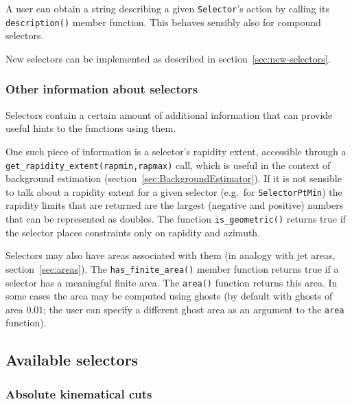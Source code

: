 \documentclass[12pt,a4]{article}
\newcommand{\ttt}[1]{{\small\texttt{#1}}}
\begin{document}
A user can obtain a string describing a given \ttt{Selector}'s action by
calling its \ttt{description()} member function. 
%
This behaves sensibly also for compound selectors.

New selectors can be implemented as described in
section~\ref{sec:new-selectors}.


\subsubsection{Other information about selectors}


Selectors contain a certain amount of additional information that can
provide useful hints to the functions using them.

One such piece of information is a selector's rapidity extent,
accessible through a \ttt{get\_rapidity\_extent(rapmin,rapmax)} call,
which is useful in the context of background estimation
(section~\ref{sec:BackgroundEstimator}).
%
If it is not sensible to talk about a rapidity extent for a given
selector (e.g.\ for \ttt{SelectorPtMin}) the rapidity limits that are
returned are the largest (negative and positive) numbers that can be
represented as doubles.
%
The function \ttt{is\_geometric()} returns true if the selector places
constraints only on rapidity and azimuth.

Selectors may also have areas associated with them (in analogy with
jet areas, section~\ref{sec:areas}).
%
The \ttt{has\_finite\_area()} member function returns true if a selector has a
meaningful finite area. The \ttt{area()} function returns this area.
%
In some cases the area may be computed using ghosts (by default with
ghosts of area $0.01$; the user can specify a different ghost area as
an argument to the \ttt{area} function).



\subsection{Available selectors}

\subsubsection{Absolute kinematical cuts}
\end{document}
